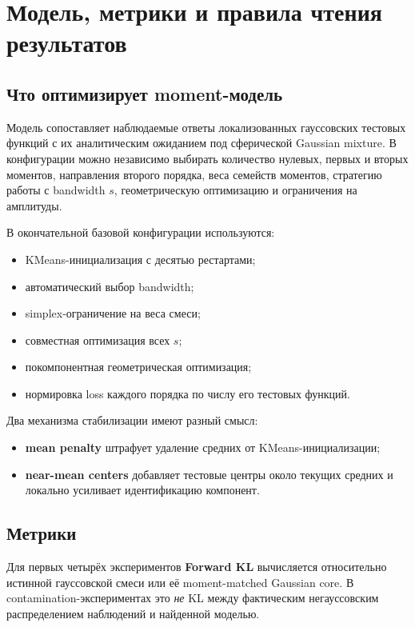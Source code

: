 \documentclass[11pt,a4paper]{article}
\begin{document}
\section{Модель, метрики и правила чтения результатов}

\subsection{Что оптимизирует moment-модель}

Модель сопоставляет наблюдаемые ответы локализованных гауссовских тестовых
функций с их аналитическим ожиданием под сферической Gaussian mixture.
В конфигурации можно независимо выбирать количество нулевых, первых и вторых
моментов, направления второго порядка, веса семейств моментов, стратегию
работы с bandwidth $s$, геометрическую оптимизацию и ограничения на
амплитуды.

В окончательной базовой конфигурации используются:

\begin{itemize}
  \item KMeans-инициализация с десятью рестартами;
  \item автоматический выбор bandwidth;
  \item simplex-ограничение на веса смеси;
  \item совместная оптимизация всех $s$;
  \item покомпонентная геометрическая оптимизация;
  \item нормировка loss каждого порядка по числу его тестовых функций.
\end{itemize}

Два механизма стабилизации имеют разный смысл:

\begin{itemize}
  \item \textbf{mean penalty} штрафует удаление средних от KMeans-инициализации;
  \item \textbf{near-mean centers} добавляет тестовые центры около текущих
        средних и локально усиливает идентификацию компонент.
\end{itemize}

\subsection{Метрики}

Для первых четырёх экспериментов \textbf{Forward KL} вычисляется относительно
истинной гауссовской смеси или её moment-matched Gaussian core. В
contamination-экспериментах это \emph{не} KL между фактическим
негауссовским распределением наблюдений и найденной моделью.
\end{document}

